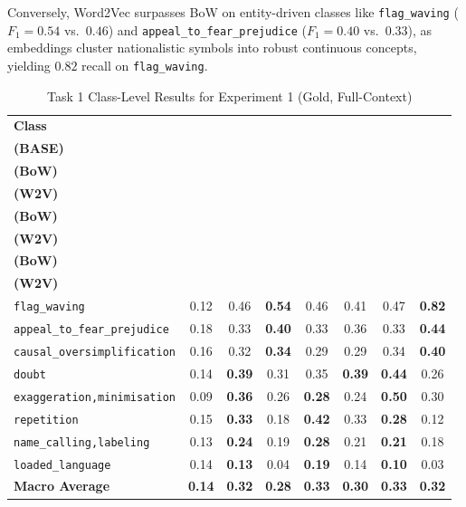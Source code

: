 \documentclass[12pt, a4paper]{article}
\begin{document}
Conversely, Word2Vec surpasses BoW on entity-driven classes like \texttt{flag\_waving} ($F_1 = 0.54$ vs.\ $0.46$) and \texttt{appeal\_to\_fear\_prejudice} ($F_1 = 0.40$ vs.\ $0.33$), as embeddings cluster nationalistic symbols into robust continuous concepts, yielding $0.82$ recall on \texttt{flag\_waving}.


\begin{table}[htbp]
  \centering
  \caption{Task 1 Class-Level Results for Experiment 1 (Gold, Full-Context)}
  \label{tab:class_level_results}
  \scriptsize
  \setlength{\tabcolsep}{3.5pt}
  \begin{tabularx}{\textwidth}{X c c c c c c c}
    \toprule
    \textbf{Class} & \makecell{\textbf{$F_1$}\\\textbf{(BASE)}} & \makecell{\textbf{$F_1$}\\\textbf{(BoW)}} & \makecell{\textbf{$F_1$}\\\textbf{(W2V)}} & \makecell{\textbf{Precision}\\\textbf{(BoW)}} & \makecell{\textbf{Precision}\\\textbf{(W2V)}} & \makecell{\textbf{Recall}\\\textbf{(BoW)}} & \makecell{\textbf{Recall}\\\textbf{(W2V)}} \\
    \midrule
    \texttt{flag\_waving} & 0.12 & 0.46 & \textbf{0.54} & 0.46 & 0.41 & 0.47 & \textbf{0.82} \\
    \addlinespace
    \texttt{appeal\_to\_fear\_prejudice} & 0.18 & 0.33 & \textbf{0.40} & 0.33 & 0.36 & 0.33 & \textbf{0.44} \\
    \addlinespace
    \texttt{causal\_oversimplification} & 0.16 & 0.32 & \textbf{0.34} & 0.29 & 0.29 & 0.34 & \textbf{0.40} \\
    \addlinespace
    \texttt{doubt} & 0.14 & \textbf{0.39} & 0.31 & 0.35 & \textbf{0.39} & \textbf{0.44} & 0.26 \\
    \addlinespace
    \texttt{exaggeration,minimisation} & 0.09 & \textbf{0.36} & 0.26 & \textbf{0.28} & 0.24 & \textbf{0.50} & 0.30 \\
    \addlinespace
    \texttt{repetition} & 0.15 & \textbf{0.33} & 0.18 & \textbf{0.42} & 0.33 & \textbf{0.28} & 0.12 \\
    \addlinespace
    \texttt{name\_calling,labeling} & 0.13 & \textbf{0.24} & 0.19 & \textbf{0.28} & 0.21 & \textbf{0.21} & 0.18 \\
    \addlinespace
    \texttt{loaded\_language} & 0.14 & \textbf{0.13} & 0.04 & \textbf{0.19} & 0.14 & \textbf{0.10} & 0.03 \\
    \midrule
    \textbf{Macro Average} & \textbf{0.14} & \textbf{0.32} & \textbf{0.28} & \textbf{0.33} & \textbf{0.30} & \textbf{0.33} & \textbf{0.32} \\
    \bottomrule
  \end{tabularx}
\end{table}
\end{document}
